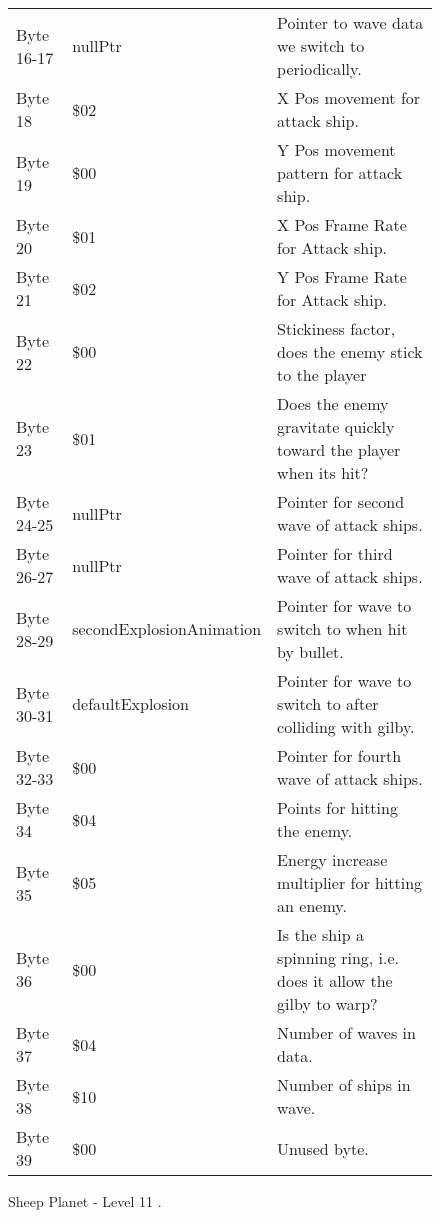 \begin{figure}[H]
{\begin{adjustbox}{width=12cm}
\begin{tabular}{lll}
 Byte 16-17 & nullPtr                          & Pointer to wave data we switch to periodically.                     \\
 Byte 18    & \$02                              & X Pos movement for attack ship.                                     \\
 Byte 19    & \$00                              & Y Pos movement pattern for attack ship.                             \\
 Byte 20    & \$01                              & X Pos Frame Rate for Attack ship.                                   \\
 Byte 21    & \$02                              & Y Pos Frame Rate for Attack ship.                                   \\
 Byte 22    & \$00                              & Stickiness factor, does the enemy stick to the player               \\
 Byte 23    & \$01                              & Does the enemy gravitate quickly toward the player when its hit?    \\
 Byte 24-25 & nullPtr                          & Pointer for second wave of attack ships.                            \\
 Byte 26-27 & nullPtr                          & Pointer for third wave of attack ships.                             \\
 Byte 28-29 & secondExplosionAnimation         & Pointer for wave to switch to when hit by bullet.                   \\
 Byte 30-31 & defaultExplosion                 & Pointer for  wave to switch to after colliding with gilby.          \\
 Byte 32-33 & \$00                              & Pointer for fourth wave of attack ships.                            \\
 Byte 34    & \$04                              & Points for hitting the enemy.                                       \\
 Byte 35    & \$05                              & Energy increase multiplier for hitting an enemy.                    \\
 Byte 36    & \$00                              & Is the ship a spinning ring, i.e. does it allow the gilby to warp?  \\
 Byte 37    & \$04                              & Number of waves in data.                                            \\
 Byte 38    & \$10                              & Number of ships in wave.                                            \\
 Byte 39    & \$00                              & Unused byte.                                                        \\
\bottomrule
\end{tabular}

  \end{adjustbox}

  }\caption*{Sheep Planet - Level 11
.}
\end{figure}

